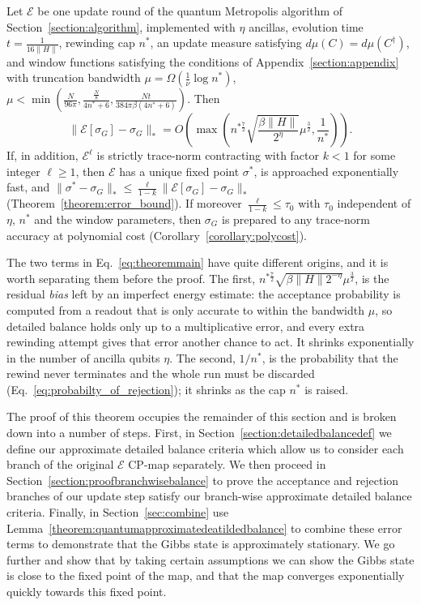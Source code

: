 \begin{theorem}
\label{theorem:main}
Let $\mathcal{E}$ be one update round of the quantum Metropolis algorithm of Section~\ref{section:algorithm}, implemented with $\eta$ ancillas, evolution time $t = \frac{1}{16\|H\|}$, rewinding cap $n^*$, an update measure satisfying $d\mu(C)=d\mu(C^{\dagger})$, and window functions satisfying the conditions of Appendix~\ref{section:appendix} with truncation bandwidth $\mu = \Omega(\frac{1}{\nu}\log n^*)$, $\mu < \min(\frac{N}{96\pi}, \frac{\frac{N}{8}}{4n^*+6}, \frac{Nt}{384\pi\beta(4n^*+6)})$. Then
\begin{equation}
   \|\mathcal{E}[\sigma_G] - \sigma_G\|_* = O\left(\max\left( n^{*\frac{7}{2}}\sqrt{\frac{\beta\|H\| }{2^{\eta}}}\mu^{\frac{3}{2}},\frac{1}{n^*}\right)\right).
\label{eq:theoremmain}
\end{equation}
If, in addition, $\mathcal{E}^{\ell}$ is strictly trace-norm contracting with factor $k<1$ for some integer $\ell\geq1$, then $\mathcal{E}$ has a unique fixed point $\sigma^*$, is approached exponentially fast, and $\|\sigma^*-\sigma_G\|_* \leq \frac{\ell}{1-k}\|\mathcal{E}[\sigma_G] - \sigma_G\|_*$ (Theorem~\ref{theorem:error_bound}). If moreover $\frac{\ell}{1-k}\leq\tau_0$ with $\tau_0$ independent of $\eta$, $n^*$ and the window parameters, then $\sigma_G$ is prepared to any trace-norm accuracy at polynomial cost (Corollary~\ref{corollary:polycost}).
\end{theorem}

The two terms in Eq.~\eqref{eq:theoremmain} have quite different origins, and it is worth separating them before the proof. The first, $n^{*\frac{7}{2}}\sqrt{\beta\|H\|2^{-\eta}}\mu^{\frac{3}{2}}$, is the residual \emph{bias} left by an imperfect energy estimate: the acceptance probability is computed from a readout that is only accurate to within the bandwidth $\mu$, so detailed balance holds only up to a multiplicative error, and every extra rewinding attempt gives that error another chance to act. It shrinks exponentially in the number of ancilla qubits $\eta$. The second, $1/n^*$, is the probability that the rewind never terminates and the whole run must be discarded (Eq.~\eqref{eq:probabilty_of_rejection}); it shrinks as the cap $n^*$ is raised.

The proof of this theorem occupies the remainder of this section and is broken down into a number of steps. First, in Section~\ref{section:detailedbalancedef} we define our approximate detailed balance criteria which allow us to consider each branch of the original $\mathcal{E}$ CP-map separately. We then proceed in Section~\ref{section:proofbranchwisebalance} to prove the acceptance and rejection branches of our update step satisfy our branch-wise approximate detailed balance criteria. Finally, in Section~\ref{sec:combine} use Lemma~\ref{theorem:quantumapproximatedeatildedbalance} to combine these error terms to demonstrate that the Gibbs state is approximately stationary. We go further and show that by taking certain assumptions we can show the Gibbs state is close to the fixed point of the map, and that the map converges exponentially quickly towards this fixed point.
